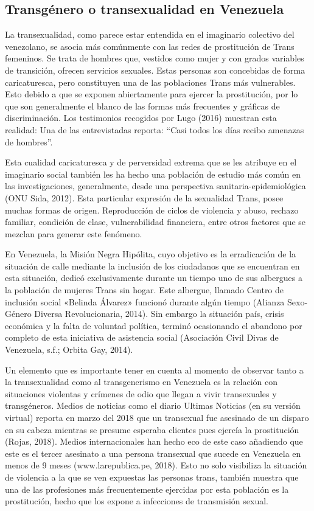 \subsection{Transgénero o transexualidad en Venezuela}
La transexualidad, como parece estar entendida en el imaginario colectivo del
venezolano, se asocia más comúnmente con las redes de prostitución de Trans
femeninos.
Se trata de hombres que, vestidos como mujer y con grados variables de
transición, ofrecen servicios sexuales.
Estas personas son concebidas de forma caricaturesca, pero constituyen una de
las poblaciones Trans más vulnerables.
Esto debido a que se exponen abiertamente para ejercer la prostitución, por lo
que son generalmente el blanco de las formas más frecuentes y gráficas de
discriminación.
Los testimonios recogidos por Lugo (2016) muestran esta realidad: Una de las
entrevistadas reporta: “Casi todos los días recibo amenazas de hombres”.

Esta cualidad caricaturesca y de perversidad extrema que se les atribuye en el
imaginario social también les ha hecho una población de estudio más común en las
investigaciones, generalmente, desde una perspectiva sanitaria-epidemiológica
(ONU Sida, 2012).
Esta particular expresión de la sexualidad Trans, posee muchas formas de origen.
Reproducción de ciclos de violencia y abuso, rechazo familiar, condición de
clase, vulnerabilidad financiera, entre otros factores que se mezclan para
generar este fenómeno.

En Venezuela, la Misión Negra Hipólita, cuyo objetivo es la erradicación de la
situación de calle mediante la inclusión de los ciudadanos que se encuentran en
esta situación, dedicó exclusivamente durante un tiempo uno de sus albergues a
la población de mujeres Trans sin hogar.
Este albergue, llamado Centro de inclusión social «Belinda Álvarez» funcionó
durante algún tiempo (Alianza Sexo-Género Diversa Revolucionaria, 2014).
Sin embargo la situación país, crisis económica y la falta de voluntad política,
terminó ocasionando el abandono por completo de esta iniciativa de asistencia
social (Asociación Civil Divas de Venezuela, s.f.; Orbita Gay, 2014).

Un elemento que es importante tener en cuenta al momento de observar tanto a la
transexualidad como al transgenerismo en Venezuela es la relación con
situaciones violentas y crímenes de odio que llegan a vivir transexuales y
transgéneros.
Medios de noticias como el diario Ultimas Noticias (en su versión virtual)
reporta en marzo del 2018 que un transexual fue asesinado de un disparo en su
cabeza mientras se presume esperaba clientes pues ejercía la prostitución
(Rojas, 2018).
Medios internacionales han hecho eco de este caso añadiendo que este es el
tercer asesinato a una persona transexual que sucede en Venezuela en menos de 9
meses (www.larepublica.pe, 2018).
Esto no solo visibiliza la situación de violencia a la que se ven expuestas las
personas trans, también muestra que una de las profesiones más frecuentemente
ejercidas por esta población es la prostitución, hecho que los expone a
infecciones de transmisión sexual.

